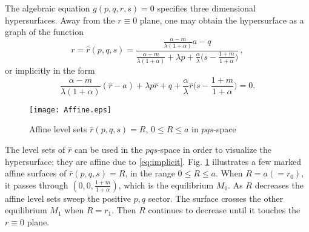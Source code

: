 \documentclass[11pt]{article}
\theoremstyle{remark}
\begin{document}
The algebraic equation $g(p,q,r,s)=0$ specifies three dimensional hypersurfaces. Away from the $r\equiv0$ plane, one may obtain the hypersurface as a graph of
the function
\begin{equation*}
r = \hat{r}(p,q,s) = \frac{ \frac{\alpha-m}{\lambda(1+\alpha)}a - q }{  \frac{\alpha-m}{\lambda(1+\alpha)} + \lambda p + \frac{\alpha}{\lambda}\big(s- \frac{1+m}{1+\alpha}\big)} \, ,
\end{equation*}
or implicitly in the form
\begin{equation}
\frac{\alpha-m}{\lambda(1+\alpha)}(\hat{r}-a) + \lambda p\hat{r} + q +\frac{\alpha}{\lambda}\hat{r}\big(s- \frac{1+m}{1+\alpha}\big)=0. \label{eq:implicit}
\end{equation}

\begin{figure}[ht]
 \centering
%
  \texttt{[image: Affine.eps]}
  \caption{Affine level sets $\hat{r}(p,q,s)=R$, $0\le R\le a$  in $pqs$-space} \label{fig:affine}
\end{figure}

The level sets of $\hat{r}$ can be used in the $pqs$-space in order to visualize the hypersurface; they are affine due to \eqref{eq:implicit}.
Fig. \ref{fig:affine} illustrates a few marked affine surfaces of $\hat{r}(p,q,s)=R$, in the range $0\le R\le a$. When $R=a(=r_0)$, it passes through $\left(0,0,\tfrac{1+m}{1+\alpha}\right)$, which is the equilibrium $M_0$. As $R$ decreases the affine level sets sweep the positive $p,q$ sector. The surface crosses the other equilibrium $M_1$ when $R=r_1$. Then $R$ continues to decrease until it touches the $r\equiv0$ plane.
\end{document}
